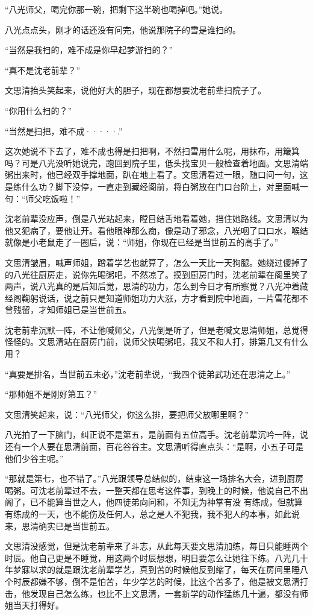 “八光师父，喝完你那一碗，把剩下这半碗也喝掉吧。”她说。

八光点点头，刚才的话还没有问完，他说那院子的雪是谁扫的。

“当然是我扫的，难不成是你早起梦游扫的？”

“真不是沈老前辈？”

文思清抬头笑起来，说他好大的胆子，现在都想要沈老前辈扫院子了。

“你用什么扫的？”

“当然是扫把，难不成·····.”

这次她说不下去了，难不成也得是扫把啊，不然扫雪用什么呢，用抹布，用簸箕吗？可是八光没听她说完，跑回到院子里，低头找宝贝一般检查着地面。文思清端粥出来时，他已经双手撑地面，趴在地上看了。文思清看过一眼，随口问一句，这是练什么功？脚下没停，一直走到藏经阁前，将白粥放在门口台阶上，对里面喊一句：“师父吃饭啦！”

沈老前辈没应声，倒是八光站起来，瞠目结舌地看着她，挡住她路线。文思清以为他又犯病了，要他让开。看他眼神那么痴，像是动了邪念，八光咽了口口水，喉结就像是小老鼠走了一圈后，说：“师姐，你现在已经是当世前五的高手了。”

文思清皱眉，喊声师姐，蹭着学艺也就算了，怎么一天比一天狗腿。她绕过傻掉了的八光往厨房走，说你先喝粥吧，不然凉了。摸到厨房门时，沈老前辈在阁里笑了两声，说八光真的是后知后觉，思清的功力，怎么到今日才有所察觉？八光冲着藏经阁鞠躬说话，说之前只是知道师姐功力大涨，方才看到院中地面，一片雪花都不曾残留，才知师姐已是当世前五。

沈老前辈沉默一阵，不让他喊师父，八光倒是听了，但是老喊文思清师姐，总觉得怪怪的。文思清站在厨房门前，说师父快喝粥吧，我又不和人打，排第几又有什么用？

“真要是排名，当世前五未必，”沈老前辈说，“我四个徒弟武功还在思清之上。”

“那师姐不是刚好第五？”

文思清笑起来，说：“八光师父，你这么排，要把师父放哪里啊？”

八光拍了一下脑门，纠正说不是第五，是前面有五位高手。沈老前辈沉吟一阵，说还有一个人要在思清前面，百花谷谷主。文思清听得直点头：“是啊，小五子可是他们少谷主呢。”

“那就是第七，也不错了。”八光跟领导总结似的，结束这一场排名大会，进到厨房喝粥。可沈老前辈过不去，一整天都在思考这件事，到晚上的时候，他说自己不出阁了，已不能算当世之人，他四徒弟向问和，不知无为神掌有没
有练成，但就算有练成的一天，也不能伤及任何人，总之是人不犯我，我不犯人的本事，如此说来，思清确实已是当世前五。

文思清没感觉，但是沈老前辈来了斗志，从此每天要文思清加练，每日只能睡两个时辰。他自己更是不睡觉，用这两个时辰想想，明日要怎么让她往下练。八光几十年梦寐以求的就是跟沈老前辈学艺，真到苦的时候他反到缩了，每天在房间里睡八个时辰都嫌不够，倒不是怕苦，年少学艺的时候，比这个苦多了，他是被文思清打击，他发现自己怎么练，也比不上文思清，一套新学的动作猛练几十遍，都没有师姐当天打得好。

